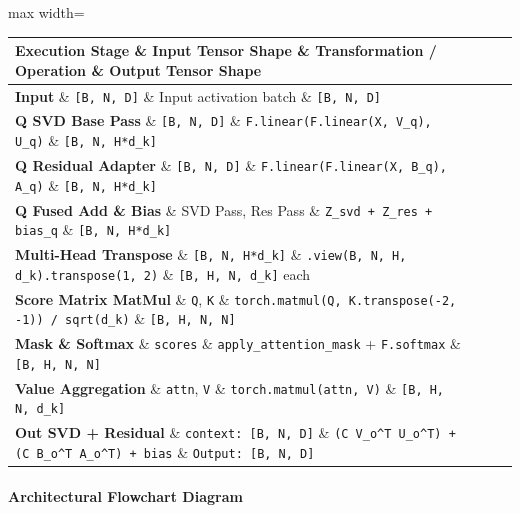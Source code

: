 \begin{center}
\begin{adjustbox}{max width=\columnwidth}
\renewcommand{\arraystretch}{1.2}
\begin{tabular}{llll}
\toprule
Execution Stage \& Input Tensor Shape \& Transformation / Operation \& Output Tensor Shape \\
\midrule
\textbf{Input} \& \texttt{[B, N, D]} \& Input activation batch \& \texttt{[B, N, D]} \\
\textbf{Q SVD Base Pass} \& \texttt{[B, N, D]} \& \texttt{F.linear(F.linear(X, V\_q), U\_q)} \& \texttt{[B, N, H*d\_k]} \\
\textbf{Q Residual Adapter} \& \texttt{[B, N, D]} \& \texttt{F.linear(F.linear(X, B\_q), A\_q)} \& \texttt{[B, N, H*d\_k]} \\
\textbf{Q Fused Add \& Bias} \& SVD Pass, Res Pass \& \texttt{Z\_svd + Z\_res + bias\_q} \& \texttt{[B, N, H*d\_k]} \\
\textbf{Multi-Head Transpose} \& \texttt{[B, N, H*d\_k]} \& \texttt{.view(B, N, H, d\_k).transpose(1, 2)} \& \texttt{[B, H, N, d\_k]} each \\
\textbf{Score Matrix MatMul} \& \texttt{Q}, \texttt{K} \& \texttt{torch.matmul(Q, K.transpose(-2, -1)) / sqrt(d\_k)} \& \texttt{[B, H, N, N]} \\
\textbf{Mask \& Softmax} \& \texttt{scores} \& \texttt{apply\_attention\_mask} + \texttt{F.softmax} \& \texttt{[B, H, N, N]} \\
\textbf{Value Aggregation} \& \texttt{attn}, \texttt{V} \& \texttt{torch.matmul(attn, V)} \& \texttt{[B, H, N, d\_k]} \\
\textbf{Out SVD + Residual} \& \texttt{context: [B, N, D]} \& \texttt{(C V\_o\textasciicircum{}T U\_o\textasciicircum{}T) + (C B\_o\textasciicircum{}T A\_o\textasciicircum{}T) + bias} \& \texttt{Output: [B, N, D]} \\

\bottomrule
\end{tabular}
\end{adjustbox}
\end{center}
\paragraph{Architectural Flowchart Diagram}

